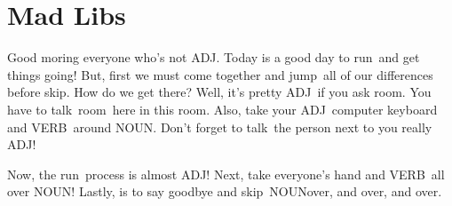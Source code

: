 \documentclass[]{article}
\newcommand{\verbOne}{run}
\newcommand{\verbTwo}{jump}
\newcommand{\verbThree}{skip}
\newcommand{\verbFour}{talk}
\newcommand{\verbFive}{VERB}
\newcommand{\verbSix}{VERB}
\newcommand{\nounTwo}{room}
\newcommand{\nounThree}{NOUN}
\newcommand{\nounFour}{NOUN}
\newcommand{\nounFive}{NOUN}
\newcommand{\adjOne}{ADJ}
\newcommand{\adjTwo}{ADJ}
\newcommand{\adjThree}{ADJ}
\newcommand{\adjFive}{ADJ}
\begin{document}
\section{Mad Libs}

Good moring everyone who's not \adjOne.
Today is a good day to \verbOne~and get things going!
But, first we must come together and \verbTwo~all of our differences before \verbThree.
How do we get there?
Well, it's pretty \adjTwo~if you ask \nounTwo.
You have to \verbFour~\nounTwo~here in this room.
Also, take your \adjFive~computer keyboard and \verbFive~around \nounThree.
Don't forget to \verbFour~the person next to you really \adjThree!

Now, the \verbOne~process is almost \adjTwo!
Next, take everyone's hand and \verbSix~all over \nounFour!
Lastly, is to say goodbye and \verbThree~\nounFive over, and over, and over.
\end{document}
